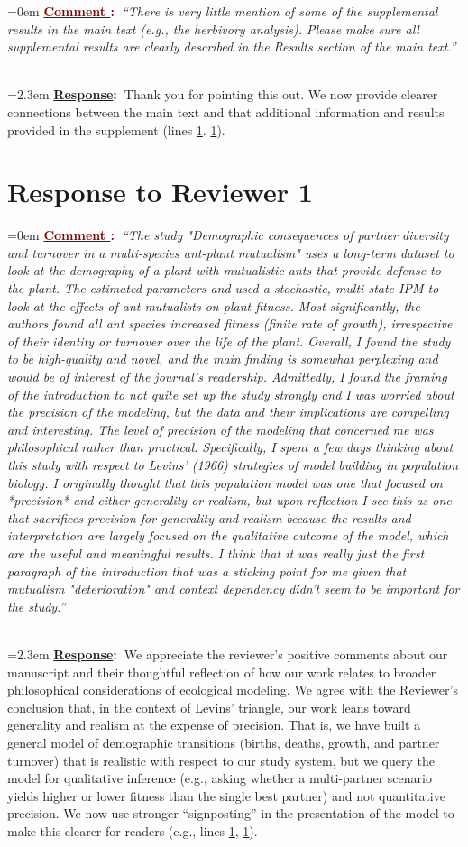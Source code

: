 \documentclass[12pt]{article}
\newcounter{cN}
\newcommand{\comment}[1]{
	\vspace{2em}
	\refstepcounter{cN} %
	\noindent \hangindent=0em \textbf{\textcolor{Maroon}{\uline{Comment \thecN}:~}}\emph{``#1''}
	}
\newcommand{\response}[1]{
	\\[0.25em]
	\hangindent=2.3em \textbf{\textcolor{NavyBlue}{\uline{Response}:~}}#1
	}
\begin{document}
\comment{There is very little mention of some of the supplemental results in the main text (e.g., the herbivory analysis). Please make sure all supplemental results are clearly described in the Results section of the main text.}
\response{Thank you for pointing this out. We now provide clearer connections between the main text and that additional information and results provided in the supplement (lines \ref{}. \ref{}).}

\section{Response to Reviewer 1}
\vspace{-2em}

\comment{The study "Demographic consequences of partner diversity and turnover in a multi-species ant-plant mutualism" uses a long-term dataset to look at the demography of a plant with mutualistic ants that provide defense to the plant. 
The estimated parameters and used a stochastic, multi-state IPM to look at the effects of ant mutualists on plant fitness. 
Most significantly, the authors found all ant species increased fitness (finite rate of growth), irrespective of their identity or turnover over the life of the plant. 
Overall, I found the study to be high-quality and novel, and the main finding is somewhat perplexing and would be of interest of the journal's readership. 
Admittedly, I found the framing of the introduction to not quite set up the study strongly and I was worried about the precision of the modeling, but the data and their implications are compelling and interesting. 
The level of precision of the modeling that concerned me was philosophical rather than practical. 
Specifically, I spent a few days thinking about this study with respect to Levins' (1966) strategies of model building in population biology. 
I originally thought that this population model was one that focused on *precision* and either generality or realism, but upon reflection I see this as one that sacrifices precision for generality and realism because the results and interpretation are largely focused on the qualitative outcome of the model, which are the useful and meaningful results. 
I think that it was really just the first paragraph of the introduction that was a sticking point for me given that mutualism "deterioration" and context dependency didn't seem to be important for the study.}
\response{We appreciate the reviewer's positive comments about our manuscript and their thoughtful reflection of how our work relates to broader philosophical considerations of ecological modeling. 
	We agree with the Reviewer's conclusion that, in the context of Levins' triangle, our work leans toward generality and realism at the expense of precision. 
That is, we have built a general model of demographic transitions (births, deaths, growth, and partner turnover) that is realistic with respect to our study system, but we query the model for qualitative inference (e.g., asking whether a multi-partner scenario yields higher or lower fitness than the single best partner) and not quantitative precision. 
We now use stronger ``signposting'' in the presentation of the model to make this clearer for readers (e.g., lines \ref{}, \ref{}).}
\end{document}
